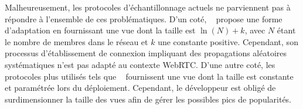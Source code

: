 





Malheureusement, les protocoles d'échantillonnage actuels ne parviennent pas à
répondre à l'ensemble de ces problématiques. D'un coté,
\SCAMP~\cite{ganesh2001scamp, ganesh2003peer} propose une forme d'adaptation en
fournissant une vue dont la taille est $\ln (N) + k$, avec $N$ étant le nombre
de membres dans le réseau et $k$ une constante positive. Cependant, son
processus d'établissement de connexion impliquant des propagations aléatoires
systématiques n'est pas adapté au contexte WebRTC. D'une autre coté, les
protocoles plus utilisés tels que \CYCLON~\cite{voulgaris2005cyclon} fournissent
une vue dont la taille est constante et paramétrée lors du
déploiement. Cependant, le développeur est obligé de surdimensionner la taille
des vues afin de gérer les possibles pics de popularités.



